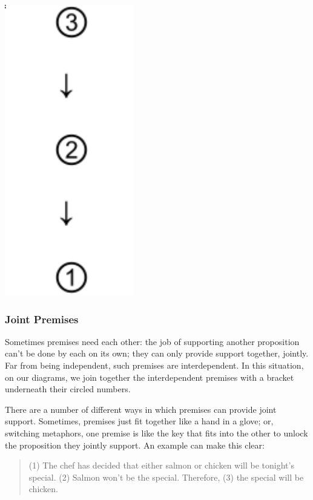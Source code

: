 \includegraphics[scale=.49]{diagram2.pdf}


\subsubsection{Joint Premises}
Sometimes premises need each other: the job of supporting another proposition can't be done by
each on its own; they can only provide support together, jointly. Far from being independent, such
premises are interdependent. In this situation, on our diagrams, we join together the interdependent
premises with a bracket underneath their circled numbers.

There are a number of different ways in which premises can provide joint support. Sometimes,
premises just fit together like a hand in a glove; or, switching metaphors, one premise is like the
key that fits into the other to unlock the proposition they jointly support. An example can make
this clear:

\begin{quote}
(1) The chef has decided that either salmon or chicken will be tonight's special. (2) Salmon
won't be the special. Therefore, (3) the special will be chicken.
\end{quote}

